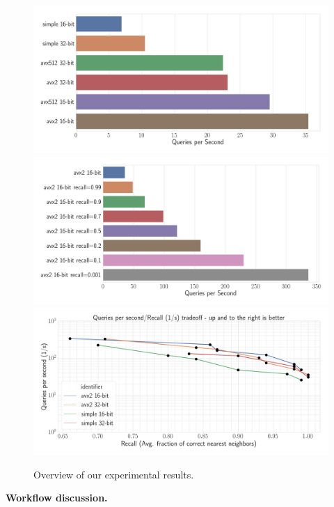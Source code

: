 \documentclass{llncs}
\newcommand{\myparagraph}[1]{\noindent \textbf{#1}}
\begin{document}
\begin{figure}
  \includegraphics[width=.8\textwidth]{figs/linearscan_no_filter.png}
  \includegraphics[width=.8\textwidth]{figs/16bit_filter.png}
  \includegraphics[width=.8\textwidth]{figs/avx2_16vs32bit.png}
  \caption{Overview of our experimental results.}
  \label{plot:eval}
\end{figure}

\myparagraph{Workflow discussion.} 
\end{document}
